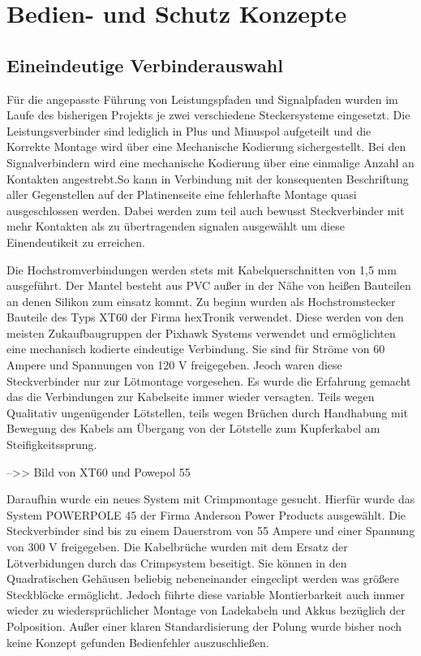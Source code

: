 \section{Bedien- und Schutz Konzepte}

\subsection{Eineindeutige Verbinderauswahl}

Für die angepasste Führung von Leistungspfaden und Signalpfaden wurden im Laufe des bisherigen Projekts je zwei verschiedene Steckersysteme eingesetzt.
Die Leistungsverbinder sind lediglich in Plus und Minuspol aufgeteilt und die Korrekte Montage wird über eine Mechanische Kodierung sichergestellt.
Bei den Signalverbindern wird eine mechanische Kodierung über eine einmalige Anzahl an Kontakten angestrebt.So kann in Verbindung mit der konsequenten Beschriftung aller Gegenstellen auf der Platinenseite eine fehlerhafte Montage quasi ausgeschlossen werden. Dabei werden zum teil auch bewusst Steckverbinder mit mehr Kontakten als zu übertragenden signalen ausgewählt um diese Einendeutikeit zu erreichen.

Die Hochstromverbindungen werden stets mit Kabelquerschnitten von 1,5 mm ausgeführt. Der Mantel besteht aus PVC außer in der Nähe von heißen Bauteilen an denen Silikon zum einsatz kommt.
Zu beginn wurden als Hochstromstecker Bauteile des Typs XT60 der Firma hexTronik verwendet.
Diese werden von den meisten Zukaufbaugruppen der Pixhawk Systems verwendet und ermöglichten eine mechanisch kodierte eindeutige Verbindung.
Sie sind für Ströme von 60 Ampere und Spannungen von 120 V freigegeben.
Jeoch waren diese Steckverbinder nur zur Lötmontage vorgesehen. Es wurde die Erfahrung gemacht das die Verbindungen zur Kabelseite immer wieder versagten. Teils wegen Qualitativ ungenügender Lötstellen, teils wegen Brüchen durch Handhabung mit Bewegung des Kabels am Übergang von der Lötstelle zum Kupferkabel am Steifigkeitssprung.

-->> Bild von XT60 und Powepol 55 

Daraufhin wurde ein neues System mit Crimpmontage gesucht.
Hierfür wurde das System POWERPOLE 45 der Firma Anderson Power Products ausgewählt. Die Steckverbinder sind bis zu einem Dauerstrom von 55 Ampere und einer Spannung von 300 V freigegeben.
Die Kabelbrüche wurden mit dem Ersatz der Lötverbidungen durch das Crimpsystem beseitigt. Sie können in den Quadratischen Gehäusen beliebig nebeneinander eingeclipt werden was größere Steckblöcke ermöglicht. Jedoch führte diese variable Montierbarkeit auch immer wieder zu wiedersprüchlicher Montage von Ladekabeln und Akkus bezüglich der Polposition.
Außer einer klaren Standardisierung der Polung wurde bisher noch keine Konzept gefunden Bedienfehler auszuschließen. 

